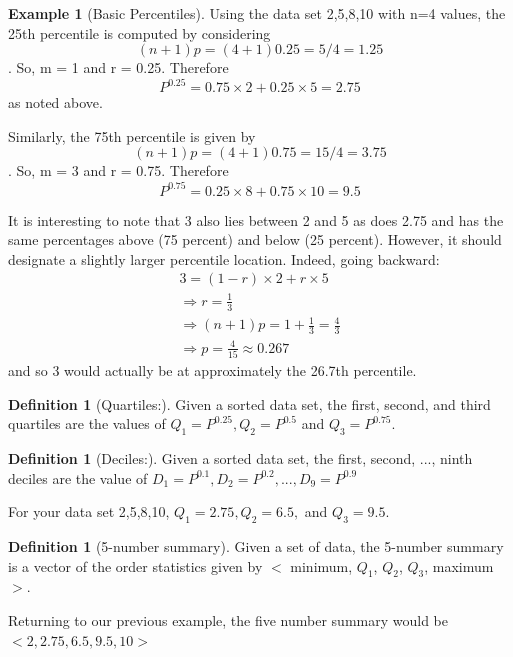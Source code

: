 \documentclass[10pt,]{book}
\theoremstyle{plain}
\theoremstyle{definition}
\newtheorem{definition}[theorem]{Definition}
\theoremstyle{definition}
\newtheorem{example}[theorem]{Example}
\theoremstyle{definition}
\numberwithin{equation}{section}
\newcommand{\lt}{ < }
\newcommand{\gt}{ > }
\begin{document}
\begin{example}[Basic Percentiles]\label{example-5}
Using the data set {2,5,8,10} with n=4 values, the 25th percentile is computed by considering 
		\begin{equation*}(n+1)p = (4+1)0.25 = 5/4 = 1.25\end{equation*}.  
		So, m = 1 and r = 0.25. Therefore 
		\begin{equation*}P^{0.25} = 0.75 \times 2 + 0.25 \times 5 = 2.75\end{equation*} 
		as noted above. 
\par

		Similarly, the 75th percentile is given by
		\begin{equation*}(n+1)p = (4+1)0.75 = 15/4 = 3.75\end{equation*}.  
		So, m = 3 and r = 0.75. Therefore 
		\begin{equation*}P^{0.75} = 0.25 \times 8 + 0.75 \times 10 = 9.5\end{equation*} 
		
		It is interesting to note that 3 also lies between 2 and 5 as does 2.75 and has the same percentages above (75 percent) and below (25 percent). However, it should designate a slightly larger percentile location. Indeed, going backward:
		\begin{gather*}
3 = (1-r) \times 2 + r \times 5\\
\Rightarrow r = \frac{1}{3}\\
\Rightarrow (n+1)p = 1 + \frac{1}{3} = \frac{4}{3}\\
\Rightarrow p = \frac{4}{15} \approx 0.267
\end{gather*}
		and so 3 would actually be at approximately the 26.7th percentile.
\end{example}
\begin{definition}[{Quartiles:}]\label{definition-4}
Given a sorted data set, the first, second, and third quartiles are the values of 
	\(Q_1 = P^{0.25}, Q_2 = P^{0.5}\) and \(Q_3 = P^{0.75}\).
\end{definition}
\begin{definition}[{Deciles:}]\label{definition-5}
Given a sorted data set, the first, second, ..., ninth deciles are the value of 
	\(D_1 = P^{0.1}, D_2 = P^{0.2}, ... , D_9 = P^{0.9}\)
\end{definition}
\par

	For your data set {2,5,8,10}, 
	\(Q_1 = 2.75, Q_2 = 6.5,\) and \(Q_3 = 9.5\).
\begin{definition}[{5-number summary}]\label{definition-6}
Given a set of data, the 5-number summary is a vector of the order statistics given by \(\lt\) minimum, \(Q_1\), \(Q_2\), \(Q_3\), maximum \(\gt\). 
\end{definition}
\par
Returning to our previous example, the five number summary would be
	\(\lt 2, 2.75, 6.5, 9.5, 10 \gt\)
\typeout{************************************************}
\typeout{************************************************}
\end{document}
